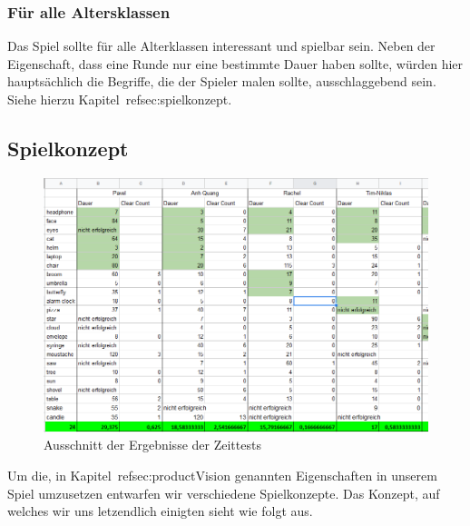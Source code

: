 \documentclass[11pt]{article}
\begin{document}
\subsubsection{Für alle Altersklassen}
Das Spiel sollte für alle Alterklassen interessant und spielbar sein. Neben der Eigenschaft, dass eine Runde nur eine bestimmte Dauer haben sollte, würden hier hauptsächlich die Begriffe, die der Spieler malen sollte, ausschlaggebend sein. Siehe hierzu Kapitel~ref{sec:spielkonzept}.
\subsection{Spielkonzept}
\label{sec:spielkonzept}
\begin{figure}[ht]
	\centering
	\includegraphics[width=1\textwidth]{images/blindtesting.png}
	\caption{\label{fig:blindtestingtable}Ausschnitt der Ergebnisse der Zeittests}
\end{figure}
Um die, in Kapitel~ref{sec:productVision} genannten Eigenschaften in unserem Spiel umzusetzen entwarfen wir verschiedene Spielkonzepte. Das Konzept, auf welches wir uns letzendlich einigten sieht wie folgt aus.
\end{document}
